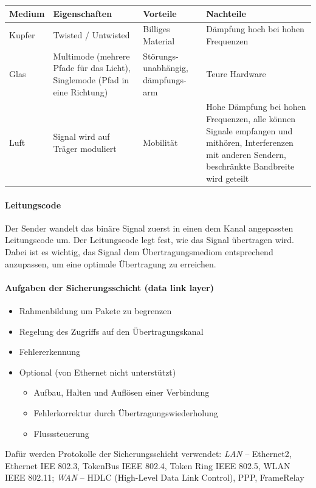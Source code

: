 \documentclass[a4paper,12pt]{article}
\begin{document}
\begin{center}
\begin{tabular}{|m{1cm}| m{3cm} |m{2cm}|m{3cm}|} 
Medium& Eigenschaften & Vorteile & Nachteile\\ 
\hline
Kupfer & Twisted / Untwisted & Billiges Material & Dämpfung hoch bei hohen Frequenzen\\
Glas & Multimode (mehrere Pfade für das Licht), Singlemode (Pfad in eine Richtung) & Störungs-unabhängig, dämpfungs-arm & Teure Hardware\\
Luft & Signal wird auf Träger moduliert & Mobilität & Hohe Dämpfung bei hohen Frequenzen, alle können Signale empfangen und mithören, Interferenzen mit anderen Sendern, beschränkte Bandbreite wird geteilt\\
\end{tabular}
\end{center}


\paragraph{Leitungscode}

Der Sender wandelt das binäre Signal zuerst in einen dem Kanal angepassten Leitungscode um. Der Leitungscode legt fest, wie das Signal übertragen wird. Dabei ist es wichtig, das Signal dem Übertragungsmediom entsprechend anzupassen, um eine optimale Übertragung zu erreichen.

\paragraph{Aufgaben der Sicherungsschicht (data link layer)}

\begin{itemize}
\item Rahmenbildung um Pakete zu begrenzen
\item Regelung des Zugriffs auf den Übertragungskanal
\item Fehlererkennung
\item Optional (von Ethernet nicht unterstützt)
	\begin{itemize}
	\item Aufbau, Halten und Auflösen einer Verbindung
	\item Fehlerkorrektur durch Übertragungswiederholung
	\item Flusssteuerung
	\end{itemize}
\end{itemize}

Dafür werden Protokolle der Sicherungsschicht verwendet: \emph{LAN} -- Ethernet2, Ethernet IEE 802.3, TokenBus IEEE 802.4, Token Ring IEEE 802.5, WLAN IEEE 802.11; \emph{WAN} -- HDLC (High-Level Data Link Control), PPP, FrameRelay
\end{document}
